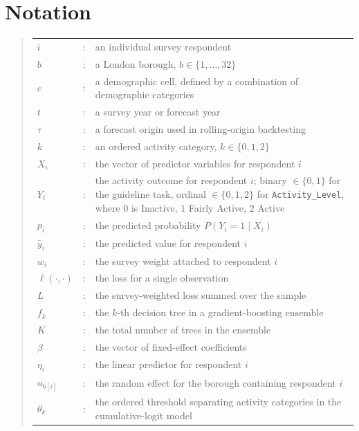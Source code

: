 \documentclass[ %
                    author={Ashrey Ashrey, Sanya Kapoor, Trisha Sharma, Yash Bhooshan Pandloskar},
                supervisor={Dr. Dalila O’Grady},
                    degree={MSc},
                     title={Using machine learning to forecast physical activity participation, volunteering and activity patterns in London},
                  subtitle={},
                      type={},
                      year={2021}]{dissertation}
\begin{document}
\section*{Notation}

\begin{quote}
\noindent
\begin{tabular}{l c >{\raggedright\arraybackslash}p{}}
$i$         & : & an individual survey respondent \\
$b$         & : & a London borough, $b \in \{ 1, \dots, 32 \}$ \\
$c$         & : & a demographic cell, defined by a combination of demographic categories \\
$t$         & : & a survey year or forecast year \\
$\tau$      & : & a forecast origin used in rolling-origin backtesting \\
$k$         & : & an ordered activity category, $k \in \{ 0, 1, 2 \}$ \\
$X_i$       & : & the vector of predictor variables for respondent $i$ \\
$Y_i$       & : & the activity outcome for respondent $i$; binary $\in \{ 0, 1 \}$ for the guideline task, ordinal $\in \{ 0, 1, 2 \}$ for \texttt{Activity\_Level}, where $0$ is Inactive, $1$ Fairly Active, $2$ Active \\
$p_i$       & : & the predicted probability $P( Y_i = 1 \mid X_i )$ \\
$\hat{y}_i$ & : & the predicted value for respondent $i$ \\
$w_i$       & : & the survey weight attached to respondent $i$ \\
$\ell( \cdot, \cdot )$ & : & the loss for a single observation \\
$L$         & : & the survey-weighted loss summed over the sample \\
$f_k$       & : & the $k$-th decision tree in a gradient-boosting ensemble \\
$K$         & : & the total number of trees in the ensemble \\
$\beta$     & : & the vector of fixed-effect coefficients \\
$\eta_i$    & : & the linear predictor for respondent $i$ \\
$u_{b[i]}$  & : & the random effect for the borough containing respondent $i$ \\
$\theta_k$  & : & the ordered threshold separating activity categories in the cumulative-logit model \\

\end{tabular}
\end{quote}
\end{document}
